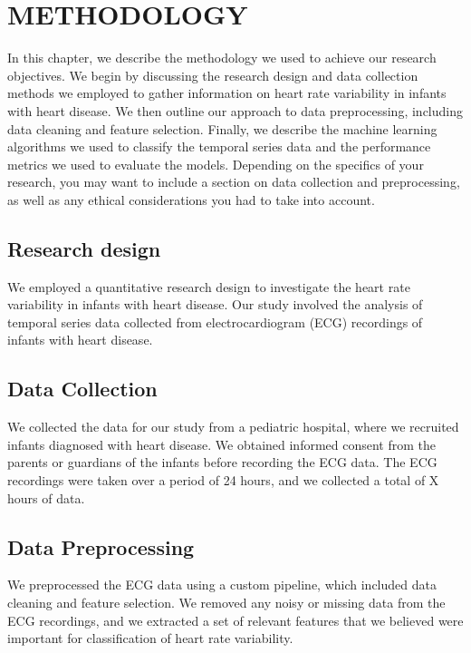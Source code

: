\section{METHODOLOGY}\label{sec:methodology}

In this chapter, we describe the methodology we used to achieve our research objectives. We begin by discussing the research design and data collection methods we employed to gather information on heart rate variability in infants with heart disease. We then outline our approach to data preprocessing, including data cleaning and feature selection. Finally, we describe the machine learning algorithms we used to classify the temporal series data and the performance metrics we used to evaluate the models. Depending on the specifics of your research, you may want to include a section on data collection and preprocessing, as well as any ethical considerations you had to take into account.


\subsection{Research design}

We employed a quantitative research design to investigate the heart rate variability in infants with heart disease. Our study involved the analysis of temporal series data collected from electrocardiogram (ECG) recordings of infants with heart disease.

\subsection{Data Collection}

We collected the data for our study from a pediatric hospital, where we recruited infants diagnosed with heart disease. We obtained informed consent from the parents or guardians of the infants before recording the ECG data. The ECG recordings were taken over a period of 24 hours, and we collected a total of X hours of data.

\subsection{Data Preprocessing}

We preprocessed the ECG data using a custom pipeline, which included data cleaning and feature selection. We removed any noisy or missing data from the ECG recordings, and we extracted a set of relevant features that we believed were important for classification of heart rate variability.


